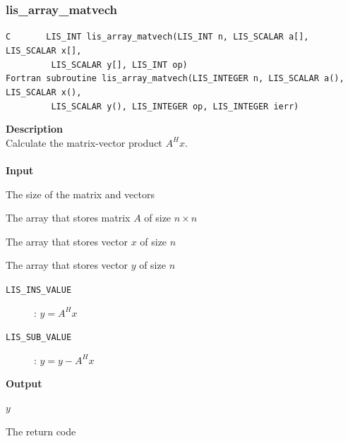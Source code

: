 \documentclass[a4paper]{article}
\newcommand{\namelistlabel}[1]{\mbox{#1}\hfill}
\newenvironment{namelist}[1]{%
\begin{list}{}
  {\let\makelabel\namelistlabel
  \settowidth{\labelwidth}{#1}
  \setlength{\leftmargin}{1.1\labelwidth}}
  }{%
\end{list}}
\begin{document}
\subsubsection{lis\_array\_matvech}
\begin{screen}
\verb|C       LIS_INT lis_array_matvech(LIS_INT n, LIS_SCALAR a[], LIS_SCALAR x[],|\\
\verb|         LIS_SCALAR y[], LIS_INT op)|\\
\verb|Fortran subroutine lis_array_matvech(LIS_INTEGER n, LIS_SCALAR a(), LIS_SCALAR x(),|\\
\verb|         LIS_SCALAR y(), LIS_INTEGER op, LIS_INTEGER ierr)|
\end{screen}
{\bf Description}\\
\indent
Calculate the matrix-vector product $A^{H}x$.
\\ \\
\noindent
{\bf Input}
\begin{namelist}{XXXXXXXXXXXXXXXXXXXX}
\item[\tt n] The size of the matrix and vectors  
\item[\tt a] The array that stores matrix $A$ of size $n \times n$
\item[\tt x] The array that stores vector $x$ of size $n$
\item[\tt y] The array that stores vector $y$ of size $n$
\item[\tt op] \begin{description}
\item[\tt LIS\_INS\_VALUE]: $y = A^Hx$
\item[\tt LIS\_SUB\_VALUE]: $y = y - A^Hx$
\end{description}
\end{namelist}
{\bf Output}
\begin{namelist}{XXXXXXXXXXXXXXXXXXXX}
\item[\tt y] $y$
\item[\tt ierr] The return code
\end{namelist}

\newpage
\end{document}
